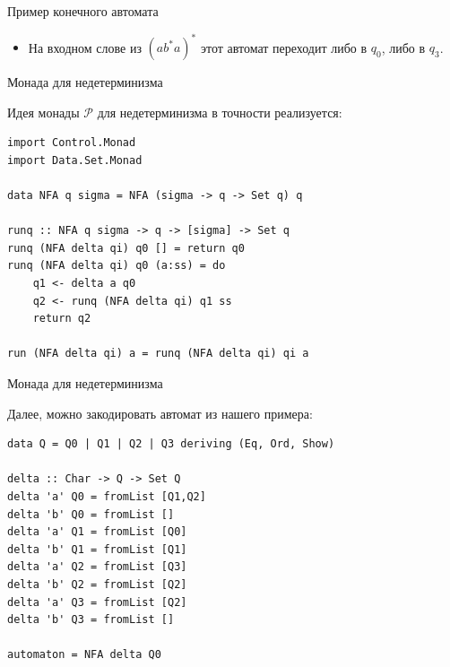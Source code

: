 \documentclass[xcolor=dvipsnames]{beamer}
\newcommand{\Pc}{\mathcal{P}}
\begin{document}
\begin{frame}{Пример конечного автомата}
 
 \begin{itemize}
  \item<2-> На входном слове из $(ab^*a)^*$ этот автомат переходит либо в $q_0$, либо в $q_3$.
 \end{itemize}


\end{frame}


\begin{frame}[fragile]{Монада для недетерминизма}
 
 Идея монады $\Pc$ для недетерминизма в точности реализуется: %

 
\begin{verbatim}
import Control.Monad
import Data.Set.Monad

data NFA q sigma = NFA (sigma -> q -> Set q) q

runq :: NFA q sigma -> q -> [sigma] -> Set q
runq (NFA delta qi) q0 [] = return q0
runq (NFA delta qi) q0 (a:ss) = do
    q1 <- delta a q0
    q2 <- runq (NFA delta qi) q1 ss
    return q2

run (NFA delta qi) a = runq (NFA delta qi) qi a
\end{verbatim}


 
\end{frame}

\begin{frame}[fragile]{Монада для недетерминизма}
 
 Далее, можно закодировать автомат из нашего примера:
 
 {\footnotesize
 \begin{verbatim}
data Q = Q0 | Q1 | Q2 | Q3 deriving (Eq, Ord, Show)
  
delta :: Char -> Q -> Set Q
delta 'a' Q0 = fromList [Q1,Q2]
delta 'b' Q0 = fromList []
delta 'a' Q1 = fromList [Q0]
delta 'b' Q1 = fromList [Q1]
delta 'a' Q2 = fromList [Q3]
delta 'b' Q2 = fromList [Q2]
delta 'a' Q3 = fromList [Q2]
delta 'b' Q3 = fromList []

automaton = NFA delta Q0
 \end{verbatim}
}

\end{frame}
\end{document}

